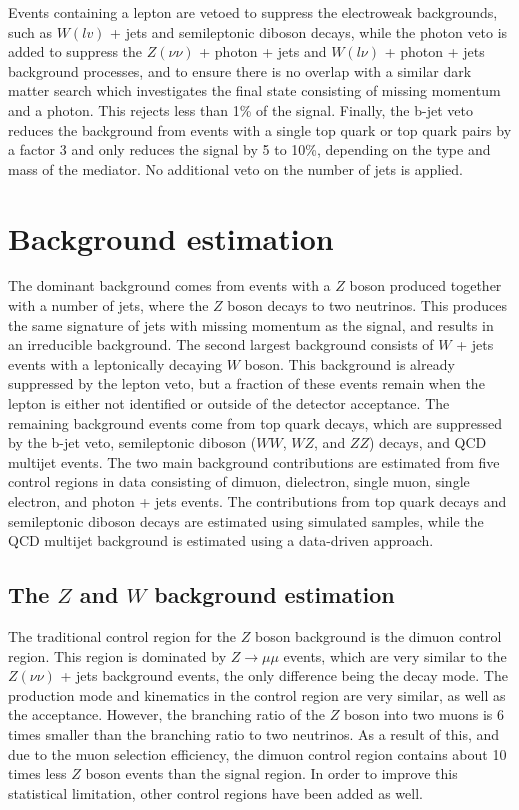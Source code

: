Events containing a lepton are vetoed to suppress the electroweak backgrounds, such as $W(lv)$ + jets and semileptonic diboson decays, while the photon veto is added to suppress the $Z(\nu\nu)$ + photon + jets and $W(l\nu)$ + photon + jets background processes, and to ensure there is no overlap with a similar dark matter search which investigates the final state consisting of missing momentum and a photon. This rejects less than 1\% of the signal. Finally, the b-jet veto reduces the background from events with a single top quark or top quark pairs by a factor 3 and only reduces the signal by 5 to 10\%, depending on the type and mass of the mediator. No additional veto on the number of jets is applied.

\section{Background estimation}
\label{sec:bkgd}

% 

The dominant background comes from events with a $Z$ boson produced together with a number of jets, where the $Z$ boson decays to two neutrinos. This produces the same signature of jets with missing momentum as the signal, and results in an irreducible background. The second largest background consists of $W$ + jets events with a leptonically decaying $W$ boson. This background is already suppressed by the lepton veto, but a fraction of these events remain when the lepton is either not identified or outside of the detector acceptance. The remaining background events come from top quark decays, which are suppressed by the b-jet veto, semileptonic diboson ($WW$, $WZ$, and $ZZ$) decays, and QCD multijet events. The two main background contributions are estimated from five control regions in data consisting of dimuon, dielectron, single muon, single electron, and photon + jets events.  The contributions from top quark decays and semileptonic diboson decays are estimated using simulated samples, while the QCD multijet background is estimated using a data-driven approach.

\subsection{The \boldmath$Z$ and \boldmath$W$ background estimation}
\label{sec:main_bkgd}

The traditional control region for the $Z$ boson background is the dimuon control region. This region is dominated by $Z\rightarrow\mu\mu$ events, which are very similar to the $Z(\nu\nu)$ + jets background events, the only difference being the decay mode. The production mode and kinematics in the control region are very similar, as well as the acceptance. However, the branching ratio of the $Z$ boson into two muons is 6 times smaller than the branching ratio to two neutrinos. As a result of this, and due to the muon selection efficiency, the dimuon control region contains about 10 times less $Z$ boson events than the signal region. In order to improve this statistical limitation, other control regions have been added as well.

